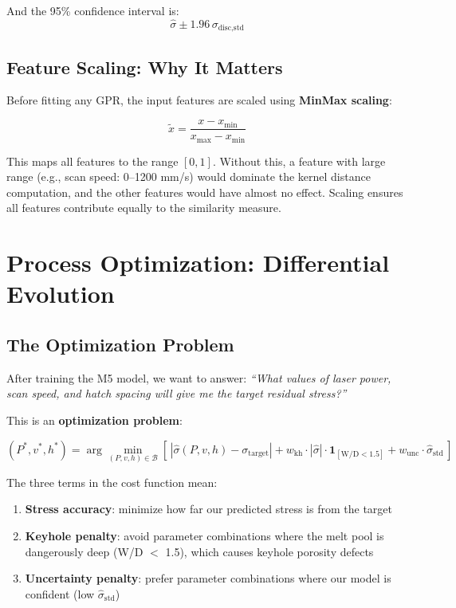 \documentclass[12pt,a4paper]{report}
\begin{document}
And the 95\% confidence interval is:
\begin{equation}
\hat{\sigma} \pm 1.96\,\sigma_{\text{disc,std}}
\end{equation}

\section{Feature Scaling: Why It Matters}

Before fitting any GPR, the input features are scaled using \textbf{MinMax scaling}:

\begin{equation}
\tilde{x} = \frac{x - x_{\min}}{x_{\max} - x_{\min}}
\end{equation}

This maps all features to the range $[0, 1]$. Without this, a feature with large range (e.g., scan speed: 0--1200 mm/s) would dominate the kernel distance computation, and the other features would have almost no effect. Scaling ensures all features contribute equally to the similarity measure.

\chapter{Process Optimization: Differential Evolution}

\section{The Optimization Problem}

After training the M5 model, we want to answer: \textit{``What values of laser power, scan speed, and hatch spacing will give me the target residual stress?''}

This is an \textbf{optimization problem}:

\begin{equation}
(P^*, v^*, h^*) = \arg\min_{(P,v,h) \in \mathcal{B}} \left[\,|\hat{\sigma}(P, v, h) - \sigma_{\text{target}}| + w_{\text{kh}} \cdot |\hat{\sigma}| \cdot \mathbf{1}_{[\text{W/D} < 1.5]} + w_{\text{unc}} \cdot \hat{\sigma}_{\text{std}}\,\right]
\end{equation}

The three terms in the cost function mean:
\begin{enumerate}
  \item \textbf{Stress accuracy}: minimize how far our predicted stress is from the target
  \item \textbf{Keyhole penalty}: avoid parameter combinations where the melt pool is dangerously deep (W/D $<$ 1.5), which causes keyhole porosity defects
  \item \textbf{Uncertainty penalty}: prefer parameter combinations where our model is confident (low $\hat{\sigma}_{\text{std}}$)
\end{enumerate}
\end{document}
